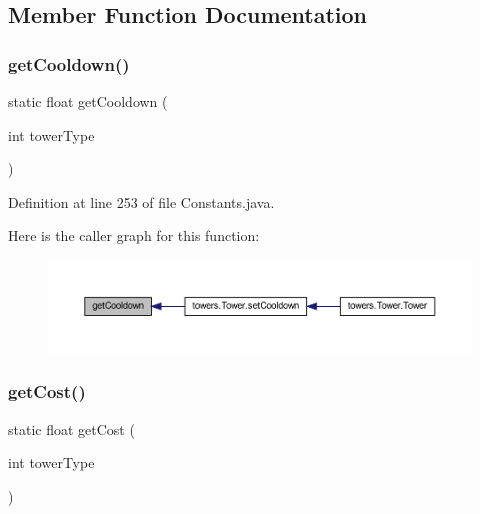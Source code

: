 \subsection{Member Function Documentation}
\mbox{\label{classhelpz_1_1_constants_1_1_towers_a4779d2fa0a45586ca954aa438b1851e0}} 
\subsubsection{\texorpdfstring{get\+Cooldown()}{getCooldown()}}
{\footnotesize\ttfamily static float get\+Cooldown (\begin{DoxyParamCaption}\item[{int}]{tower\+Type }\end{DoxyParamCaption})\hspace{0.3cm}{\ttfamily [static]}}



Definition at line 253 of file Constants.\+java.

Here is the caller graph for this function\+:\nopagebreak
\begin{figure}[H]
\begin{center}
\leavevmode
\includegraphics[width=350pt]{classhelpz_1_1_constants_1_1_towers_a4779d2fa0a45586ca954aa438b1851e0_icgraph}
\end{center}
\end{figure}
\mbox{\label{classhelpz_1_1_constants_1_1_towers_affe7d154c2065c3c8eea74993d932c2c}} 
\subsubsection{\texorpdfstring{get\+Cost()}{getCost()}}
{\footnotesize\ttfamily static float get\+Cost (\begin{DoxyParamCaption}\item[{int}]{tower\+Type }\end{DoxyParamCaption})\hspace{0.3cm}{\ttfamily [static]}}



